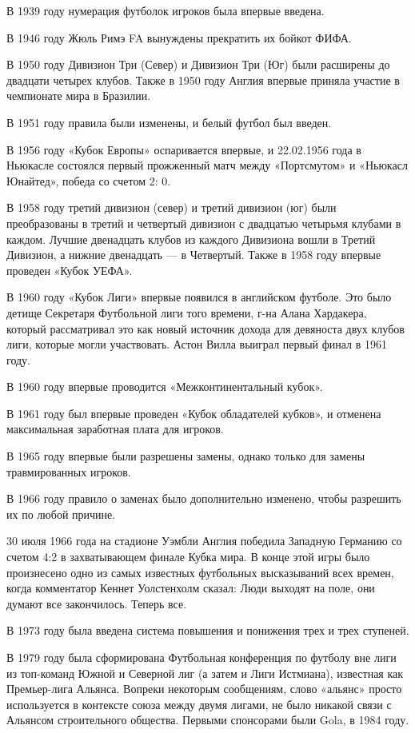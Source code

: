 В 1939 году нумерация футболок игроков была впервые введена.

В 1946 году Жюль Римэ FA вынуждены прекратить их бойкот ФИФА.

В 1950 году Дивизион Три (Север) и Дивизион Три (Юг) были расширены до двадцати четырех клубов. Также в 1950 году Англия впервые приняла участие в чемпионате мира в Бразилии.  

В 1951 году правила были изменены, и белый футбол был введен.

В 1956 году «Кубок Европы» оспаривается впервые, и 22.02.1956 года в Ньюкасле состоялся первый прожженный матч между «Портсмутом» и «Ньюкасл Юнайтед», победа со счетом 2: 0.

В 1958 году третий дивизион (север) и третий дивизион (юг) были преобразованы в третий и четвертый дивизион с двадцатью четырьмя клубами в каждом. Лучшие двенадцать клубов из каждого Дивизиона вошли в Третий Дивизион, а нижние двенадцать --- в Четвертый. Также в 1958 году впервые проведен «Кубок УЕФА».

В 1960 году «Кубок Лиги» впервые появился в английском футболе. Это было детище Секретаря Футбольной лиги того времени, г-на Алана Хардакера, который рассматривал это как новый источник дохода для девяноста двух клубов лиги, которые могли участвовать. Астон Вилла выиграл первый финал в 1961 году.

В 1960 году впервые проводится «Межконтинентальный кубок».

В 1961 году  был впервые проведен «Кубок обладателей кубков», и отменена максимальная заработная плата для игроков.

В 1965 году впервые были разрешены замены, однако только для замены травмированных игроков.

В 1966 году правило о заменах было дополнительно изменено, чтобы разрешить их по любой причине.

30 июля 1966 года на стадионе Уэмбли Англия победила Западную Германию со счетом 4:2 в захватывающем финале Кубка мира. В конце этой игры было произнесено одно из самых известных футбольных высказываний всех времен, когда комментатор Кеннет Уолстенхолм сказал: Люди выходят на поле, они думают все закончилось. Теперь все.

В 1973 году была введена система повышения и понижения трех и трех ступеней.

В 1979 году была сформирована Футбольная конференция по футболу вне лиги из топ-команд Южной и Северной лиг (а затем и Лиги Истмиана), известная как Премьер-лига Альянса. Вопреки некоторым сообщениям, слово «альянс» просто используется в контексте союза между двумя лигами, не было никакой связи с Альянсом строительного общества. Первыми спонсорами были Gola, в 1984 году.

